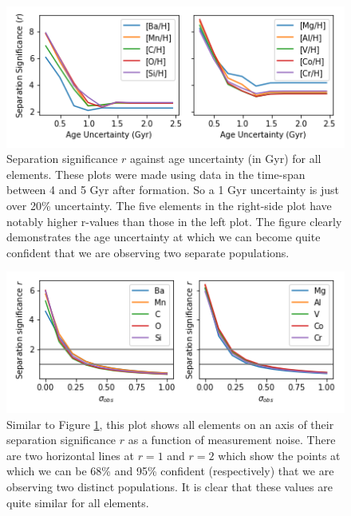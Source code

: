 \documentclass[fleqn,usenatbib]{mnras}
\begin{document}
\begin{figure}
	\includegraphics[width=\columnwidth]{figures/same_axis_r_age.png}
    \caption{Separation significance $r$ against age uncertainty (in Gyr) for all elements. These plots were made using data in the time-span between 4 and 5 Gyr after formation. So a 1 Gyr uncertainty is just over 20\% uncertainty. The five elements in the right-side plot have notably higher r-values than those in the left plot. The figure clearly demonstrates the age uncertainty at which we can become quite confident that we are observing two separate populations.}
    \label{fig:r_v_age}
\end{figure}

\begin{figure}
	\includegraphics[width=\columnwidth]{figures/same_axis_r_sigma.png}
    \caption{Similar to Figure \ref{fig:r_v_age}, this plot shows all elements on an axis of their separation significance $r$ as a function of measurement noise. There are two horizontal lines at $r=1$ and $r=2$ which show the points at which we can be 68\% and 95\% confident (respectively) that we are observing two distinct populations. It is clear that these values are quite similar for all elements.}
    \label{fig:r_v_obs}
\end{figure}
\end{document}
